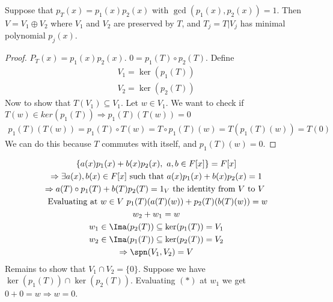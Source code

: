 \documentclass[class=scrartcl, crop=false]{standalone}
\begin{document}
\begin{proposition}
  Suppose that $p_T(x) = p_{1}(x)p_2(x)$ with $\gcd(p_1(x), p_2(x)) = 1$. Then $V = V_1 \oplus V_2$ where $V_1$ and $V_2$ are preserved by $T$, and $T_j = T|V_j$ has minimal polynomial $p_j(x)$.
  \begin{proof}
    $P_T(x) = p_1(x)p_2(x)$. $0 = p_1(T) \circ p_2(T)$. Define
    \begin{gather*}
      V_1 = \ker(p_1(T)) \\
      V_2 = \ker(p_2(T))
    \end{gather*} 
    Now to show that $T(V_1) \subseteq V_1$. Let $w \in V_1$. We want to check if $T(w) \in ker(p_1(T)) \Rightarrow p_1(T)(T(w)) = 0$
    \begin{gather*}
      p_1(T)(T(w)) = p_1(T) \circ T(w) = T \circ p_1(T) (w) = T(p_1(T)(w)) = T(0)
    \end{gather*} 
    We can do this because $T$ commutes with itself, and $p_1(T)(w) = 0$.
  \end{proof} 
  \begin{gather*}
    \{a(x)p_1(x) + b(x)p_2(x), \ a, b \in F[x]\} = F[x] \\ %
    \Rightarrow \exists a(x), b(x) \in F[x] \ \text{such that} \ a(x)p_1(x) + b(x)p_2(x) = 1 \\
    \Rightarrow a(T) \circ p_1(T) + b(T)p_2(T) = 1_V \ \text{the identity from $V$ to $V$} \ \\
    \ \text{Evaluating at $w \in V$} \ 
    p_1(T)(a(T)(w)) + p_2(T)(b(T)(w)) = w \\
    w_2 + w_1 = w \\
    w_1 \in \Ima(p_2(T)) \subseteq \ker(p_1(T)) = V_1 \\ %
    w_2 \in \Ima(p_1(T)) \subseteq \ker(p_2(T)) = V_2 \\
    \Rightarrow \spn(V_1, V_2) = V
  \end{gather*} 
  Remains to show that $V_1 \cap V_2 = \{0\}$. Suppose we have $\ker(p_1(T)) \cap \ker(p_2(T))$. Evaluating $(*)$ at $w_1$ we get $0 + 0 = w \Rightarrow w = 0$.
\end{proposition} 
\end{document}

